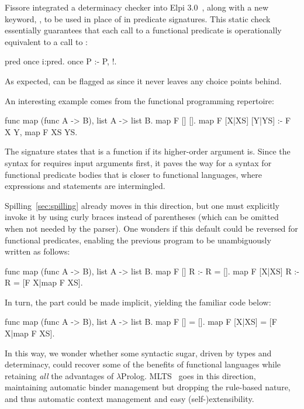 \documentclass[a4paper, 11pt]{book}
\begin{document}
Fissore
integrated a determinacy checker into Elpi 3.0~\cite{elpidet}, along with a new
keyword, , to be used in place of  in predicate
signatures. This static check essentially guarantees that each call to a
functional predicate  is operationally equivalent to a call to
:

\begin{elpicode}
pred once i:pred.
once P :- P, !.
\end{elpicode}

\noindent As expected,  can be flagged as  since it never
leaves any choice points behind.

An interesting example comes from the functional programming repertoire:
\begin{elpicode}
func map (func A -> B), list A -> list B.
map F [] [].
map F [X|XS] [Y|YS] :- F X Y, map F XS YS.
\end{elpicode}

\noindent The signature states that  is a function if its
higher-order argument  is. Since the syntax for  requires
input arguments first, it paves the way for a syntax for functional predicate
bodies that is closer to functional languages, where expressions and statements
are intermingled.

Spilling~\ref{sec:spilling} already moves in this direction, but one must
explicitly invoke it by using curly braces instead of parentheses (which can be
omitted when not needed by the parser). One wonders if this default could be
reversed for functional predicates, enabling the previous program to be
unambiguously written as follows:

\begin{elpicode}
func map (func A -> B), list A -> list B.
map F [] R :- R = [].
map F [X|XS] R :- R = [F X|map F XS].
\end{elpicode}

\noindent
In turn, the  part could be made implicit, yielding the familiar
code below:

\begin{elpicode}
func map (func A -> B), list A -> list B.
map F [] = [].
map F [X|XS] = [F X|map F XS].
\end{elpicode}

\noindent In this way, we
wonder whether some syntactic sugar, driven by types and determinacy, could
recover some of the benefits of functional languages while retaining \emph{all}
the advantages of $\lambda$Prolog. MLTS~\cite{mlts} goes in this direction,
maintaining automatic binder management but dropping the rule-based nature, and
thus automatic context management and easy (self-)extensibility.
\end{document}
